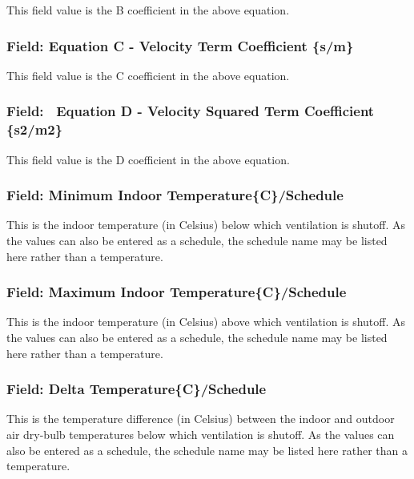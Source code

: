 This field value is the B coefficient in the above equation.

\subsubsection{Field: Equation C - Velocity Term Coefficient \{s/m\}}\label{field-equation-c---velocity-term-coefficient-sm-1}

This field value is the C coefficient in the above equation.

\subsubsection{Field:~ Equation D - Velocity Squared Term Coefficient \{s2/m2\}}\label{field-equation-d---velocity-squared-term-coefficient-s2m2-1}

This field value is the D coefficient in the above equation.

\subsubsection{Field: Minimum Indoor Temperature\{C\}/Schedule}\label{field-minimum-indoor-temperaturecschedule}

This is the indoor temperature (in Celsius) below which ventilation is shutoff. As the values can also be entered as a schedule, the schedule name may be listed here rather than a temperature.

\subsubsection{Field: Maximum Indoor Temperature\{C\}/Schedule}\label{field-maximum-indoor-temperaturecschedule}

This is the indoor temperature (in Celsius) above which ventilation is shutoff. As the values can also be entered as a schedule, the schedule name may be listed here rather than a temperature.

\subsubsection{Field: Delta Temperature\{C\}/Schedule}\label{field-delta-temperaturecschedule}

This is the temperature difference (in Celsius) between the indoor and outdoor air dry-bulb temperatures below which ventilation is shutoff. As the values can also be entered as a schedule, the schedule name may be listed here rather than a temperature.

